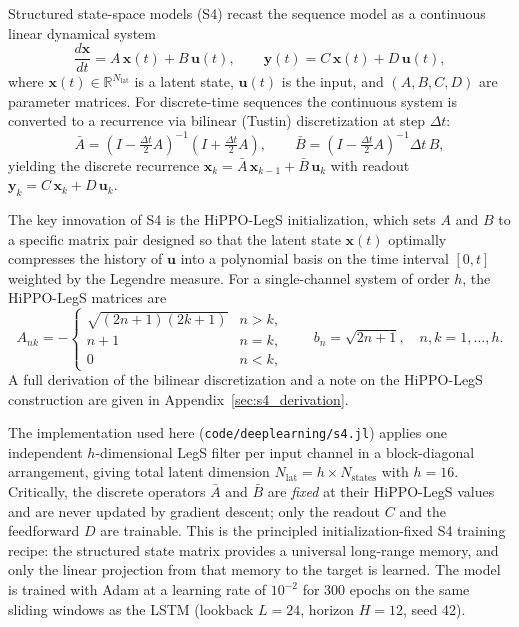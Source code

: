 Structured state-space models (S4) \cite{Gu2022} recast the sequence model as
a continuous linear dynamical system
\begin{equation}\label{eq:ssm_cont}
  \frac{d\mathbf{x}}{dt} = A\,\mathbf{x}(t) + B\,\mathbf{u}(t),
  \qquad
  \mathbf{y}(t) = C\,\mathbf{x}(t) + D\,\mathbf{u}(t),
\end{equation}
where $\mathbf{x}(t) \in \mathbb{R}^{N_{\mathrm{lat}}}$ is a latent state, $\mathbf{u}(t)$ is
the input, and $(A, B, C, D)$ are parameter matrices.  For discrete-time
sequences the continuous system is converted to a recurrence via bilinear
(Tustin) discretization at step $\Delta t$:
\begin{equation}\label{eq:ssm_disc}
  \bar{A} = \left(I - \tfrac{\Delta t}{2}A\right)^{-1}
            \left(I + \tfrac{\Delta t}{2}A\right),
  \qquad
  \bar{B} = \left(I - \tfrac{\Delta t}{2}A\right)^{-1} \Delta t\, B,
\end{equation}
yielding the discrete recurrence
$\mathbf{x}_k = \bar{A}\,\mathbf{x}_{k-1} + \bar{B}\,\mathbf{u}_k$
with readout $\mathbf{y}_k = C\,\mathbf{x}_k + D\,\mathbf{u}_k$.

The key innovation of S4 is the HiPPO-LegS initialization, which sets $A$
and $B$ to a specific matrix pair designed so that the latent state
$\mathbf{x}(t)$ optimally compresses the history of $\mathbf{u}$ into a
polynomial basis on the time interval $[0, t]$ weighted by the Legendre
measure.  For a single-channel system of order $h$, the HiPPO-LegS matrices
are
\begin{equation}\label{eq:hippo}
  A_{nk} = -\begin{cases}
              \sqrt{(2n+1)(2k+1)} & n > k,\\
              n+1                 & n = k,\\
              0                   & n < k,
            \end{cases}
  \qquad
  b_n = \sqrt{2n+1},
  \quad n,k = 1,\ldots,h.
\end{equation}
A full derivation of the bilinear discretization and a note on the HiPPO-LegS
construction are given in Appendix~\ref{sec:s4_derivation}.

The implementation used here (\texttt{code/deeplearning/s4.jl}) applies one
independent $h$-dimensional LegS filter per input channel in a block-diagonal
arrangement, giving total latent dimension $N_{\mathrm{lat}} = h \times N_{\mathrm{states}}$
with $h = 16$.  Critically, the discrete operators $\bar{A}$ and $\bar{B}$ are
\emph{fixed} at their HiPPO-LegS values and are never updated by gradient
descent; only the readout $C$ and the feedforward $D$ are trainable.  This is
the principled initialization-fixed S4 training recipe: the structured state
matrix provides a universal long-range memory, and only the linear projection
from that memory to the target is learned.  The model is trained with Adam at
a learning rate of $10^{-2}$ for 300 epochs on the same sliding windows as
the LSTM (lookback $L = 24$, horizon $H = 12$, seed 42).

